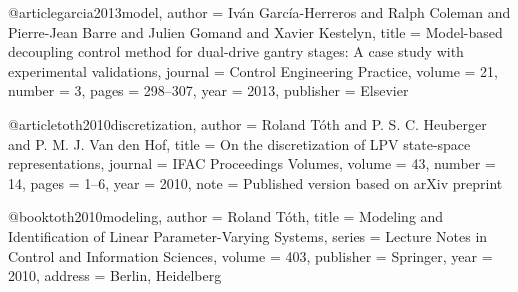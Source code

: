 @article{garcia2013model,
  author    = {Iván García-Herreros and Ralph Coleman and Pierre-Jean Barre and Julien Gomand and Xavier Kestelyn},
  title     = {Model-based decoupling control method for dual-drive gantry stages: A case study with experimental validations},
  journal   = {Control Engineering Practice},
  volume    = {21},
  number    = {3},
  pages     = {298--307},
  year      = {2013},
  publisher = {Elsevier}
}

@article{toth2010discretization,
  author  = {Roland Tóth and P. S. C. Heuberger and P. M. J. Van den Hof},
  title   = {On the discretization of {LPV} state-space representations},
  journal = {IFAC Proceedings Volumes},
  volume  = {43},
  number  = {14},
  pages   = {1--6},
  year    = {2010},
  note    = {Published version based on arXiv preprint}
}

@book{toth2010modeling,
  author    = {Roland Tóth},
  title     = {Modeling and Identification of Linear Parameter-Varying Systems},
  series    = {Lecture Notes in Control and Information Sciences},
  volume    = {403},
  publisher = {Springer},
  year      = {2010},
  address   = {Berlin, Heidelberg}
}